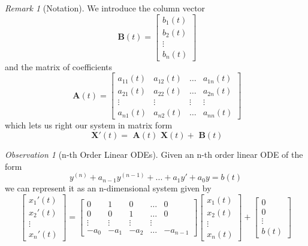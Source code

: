 \documentclass[12pt]{article}
\theoremstyle{definition}
\theoremstyle{remark}
\newtheorem{rmk}[thm]{Remark}
\newtheorem{obs}[thm]{Observation}
\numberwithin{equation}{section}
\newcommand\B[1]{\textbf{ #1}}
\begin{document}
\vspace{1cm}


\begin{rmk}[Notation]
        We introduce the column vector \begin{equation}
                \B{B}(t) = \begin{bmatrix}b_1(t) \\ b_2(t) \\ \vdots \\ b_n(t) \end{bmatrix}
        \end{equation}
        and the matrix of coefficients \begin{equation}
                \B{A}(t) = \begin{bmatrix}a_{11}(t) & a_{12}(t) & \hdots & a_{1n}(t) \\ a_{21}(t) & a_{22}(t) & \hdots & a_{2n}(t)\\ \vdots & \vdots & \vdots & \vdots \\ a_{n1}(t) & a_{n2}(t) & \hdots & a_{nn}(t) \end{bmatrix}
        \end{equation}
        which lets us right our system in matrix form \begin{equation}
                \B{X}'(t) = \B{A}(t)\B{X}(t)+\B{B}(t)
        \end{equation}
\end{rmk}


\vspace{1cm}


\begin{obs}[n-th Order Linear ODEs]
        Given an n-th order linear ODE of the form $$y^{(n)}+a_{n-1}y^{(n-1)}+...+a_1y'+a_0y=b(t)$$ we can represent it as an n-dimensional system given by \begin{equation}
                \begin{bmatrix}x_1'(t) \\ x_2'(t) \\ \vdots \\ x_n'(t) \end{bmatrix} = \begin{bmatrix} 0 & 1 & 0 & \hdots & 0 \\ 0 & 0 & 1 & \hdots & 0 \\ \vdots & \vdots & \vdots & \vdots \\ -a_0 & -a_1 & -a_2 & \hdots & -a_{n-1} \end{bmatrix}\begin{bmatrix}x_1(t) \\ x_2(t) \\ \vdots \\ x_n(t) \end{bmatrix}+\begin{bmatrix}0 \\ 0 \\ \vdots \\ b(t) \end{bmatrix}
        \end{equation}
\end{obs}
\end{document}
